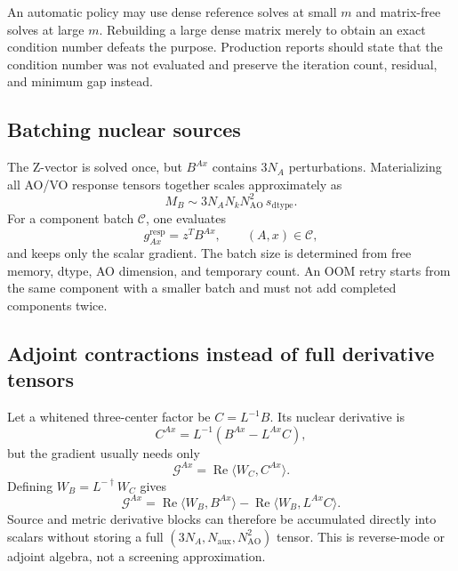 An automatic policy may use dense reference solves at small $m$ and
matrix-free solves at large $m$.  Rebuilding a large dense matrix merely to
obtain an exact condition number defeats the purpose.  Production reports
should state that the condition number was not evaluated and preserve the
iteration count, residual, and minimum gap instead.

\subsection{Batching nuclear sources}

The Z-vector is solved once, but $B^{Ax}$ contains $3N_A$ perturbations.
Materializing all AO/VO response tensors together scales approximately as
\begin{equation}
  M_B\sim 3N_A N_kN_{\mathrm{AO}}^2\,s_{\mathrm{dtype}}.
  \label{eq:nuclear-batch}
\end{equation}
For a component batch $\mathcal C$, one evaluates
\begin{equation}
  g_{Ax}^{\mathrm{resp}}=z^TB^{Ax},\qquad (A,x)\in\mathcal C,
\end{equation}
and keeps only the scalar gradient.  The batch size is determined from free
memory, dtype, AO dimension, and temporary count.  An OOM retry starts from
the same component with a smaller batch and must not add completed
components twice.

\subsection{Adjoint contractions instead of full derivative tensors}

Let a whitened three-center factor be $C=L^{-1}B$.  Its nuclear derivative is
\begin{equation}
  C^{Ax}=L^{-1}\left(B^{Ax}-L^{Ax}C\right),
  \label{eq:bounded-cderi-derivative}
\end{equation}
but the gradient usually needs only
\begin{equation}
  \mathcal G^{Ax}=\operatorname{Re}\langle W_C,C^{Ax}\rangle.
  \label{eq:reverse-contraction}
\end{equation}
Defining $W_B=L^{-\dagger}W_C$ gives
\begin{equation}
  \mathcal G^{Ax}
  =\operatorname{Re}\langle W_B,B^{Ax}\rangle
   -\operatorname{Re}\langle W_B,L^{Ax}C\rangle.
  \label{eq:reverse-cderi-response}
\end{equation}
Source and metric derivative blocks can therefore be accumulated directly
into scalars without storing a full
$(3N_A,N_{\mathrm{aux}},N_{\mathrm{AO}}^2)$ tensor.  This is reverse-mode or
adjoint algebra, not a screening approximation.

